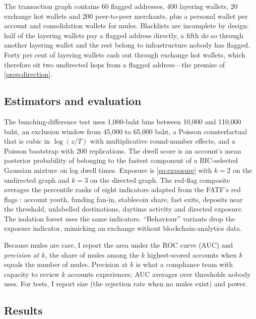 The transaction graph contains 60 flagged addresses, 400 layering wallets, 20 exchange hot wallets and 200 peer-to-peer
merchants, plus a personal wallet per account and consolidation wallets for mules. Blacklists are incomplete by
design: half of the layering wallets pay a flagged address directly, a fifth do so through another layering wallet and
the rest belong to infrastructure nobody has flagged. Forty per cent of layering wallets cash out through exchange hot
wallets, which therefore sit two undirected hops from a flagged address---the premise of \cref{prop:direction}.

\subsection{Estimators and evaluation}

The bunching-difference test uses 1,000-baht bins between 10,000 and 110,000 baht, an exclusion window from 45,000 to
65,000 baht, a Poisson counterfactual that is cubic in $\log(z/T)$ with multiplicative round-number effects, and a
Poisson bootstrap with 200 replications. The dwell score is an account's mean posterior probability of belonging to the
fastest component of a BIC-selected Gaussian mixture on log dwell times. Exposure is \cref{eq:exposure} with $k=2$ on
the undirected graph and $k=3$ on the directed graph. The red-flag composite averages the percentile ranks of eight
indicators adapted from the FATF's red flags \citep{fatf2020redflags}: account youth, funding fan-in, stablecoin share,
fast exits, deposits near the threshold, unlabelled destinations, daytime activity and directed exposure. The
isolation forest uses the same indicators. ``Behaviour'' variants drop the exposure indicator, mimicking an exchange
without blockchain-analytics data.

Because mules are rare, I report the area under the ROC curve (AUC) and \emph{precision at $k$}, the share of mules
among the $k$ highest-scored accounts when $k$ equals the number of mules. Precision at $k$ is what a compliance team
with capacity to review $k$ accounts experiences; AUC averages over thresholds nobody uses. For tests, I report size
(the rejection rate when no mules exist) and power.

\subsection{Results}

